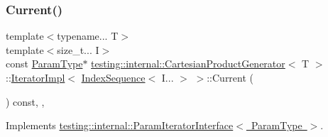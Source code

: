 \subsubsection{\texorpdfstring{Current()}{Current()}\hspace{0.1cm}{\footnotesize\ttfamily [2/2]}}
{\footnotesize\ttfamily template$<$typename... T$>$ \\
template$<$size\+\_\+t... I$>$ \\
const \mbox{\hyperlink{classtesting_1_1internal_1_1_cartesian_product_generator_af27131157a9347f0c82420ca081ee7dd}{Param\+Type}}$\ast$ \mbox{\hyperlink{classtesting_1_1internal_1_1_cartesian_product_generator}{testing\+::internal\+::\+Cartesian\+Product\+Generator}}$<$ T $>$\+::\mbox{\hyperlink{classtesting_1_1internal_1_1_cartesian_product_generator_1_1_iterator_impl}{Iterator\+Impl}}$<$ \mbox{\hyperlink{structtesting_1_1internal_1_1_index_sequence}{Index\+Sequence}}$<$ I... $>$ $>$\+::Current (\begin{DoxyParamCaption}{ }\end{DoxyParamCaption}) const\hspace{0.3cm}{\ttfamily [inline]}, {\ttfamily [override]}, {\ttfamily [virtual]}}



Implements \mbox{\hyperlink{classtesting_1_1internal_1_1_param_iterator_interface_adfff808576d929085679c315b255af7e}{testing\+::internal\+::\+Param\+Iterator\+Interface$<$ Param\+Type $>$}}.

\mbox{\label{classtesting_1_1internal_1_1_cartesian_product_generator_1_1_iterator_impl_3_01_index_sequence_3_01_i_8_8_8_01_4_01_4_a7ba6129ccd025c1cb0e00fe71b8c8489}} 
